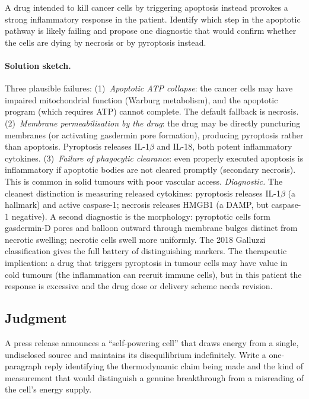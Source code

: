 \begin{exercise}
A drug intended to kill cancer cells by triggering apoptosis instead
provokes a strong inflammatory response in the patient. Identify
which step in the apoptotic pathway is likely failing and propose
one diagnostic that would confirm whether the cells are dying by
necrosis or by pyroptosis instead.
\end{exercise}

\paragraph{Solution sketch.}
Three plausible failures:
(1)~\emph{Apoptotic ATP collapse}: the cancer cells may have impaired
mitochondrial function (Warburg metabolism), and the apoptotic
program (which requires ATP) cannot complete. The default fallback
is necrosis.
(2)~\emph{Membrane permeabilisation by the drug}: the drug may be
directly puncturing membranes (or activating gasdermin pore
formation), producing pyroptosis rather than apoptosis. Pyroptosis
releases IL-1$\beta$ and IL-18, both potent inflammatory cytokines.
(3)~\emph{Failure of phagocytic clearance}: even properly executed
apoptosis is inflammatory if apoptotic bodies are not cleared promptly
(secondary necrosis). This is common in solid tumours with poor
vascular access.
\emph{Diagnostic.} The cleanest distinction is measuring released
cytokines: pyroptosis releases IL-1$\beta$ (a hallmark) and active
caspase-1; necrosis releases HMGB1 (a DAMP, but caspase-1 negative).
A second diagnostic is the morphology: pyroptotic cells form
gasdermin-D pores and balloon outward through membrane bulges
distinct from necrotic swelling; necrotic cells swell more uniformly.
The 2018 Galluzzi classification \cite{paper:v6c01-galluzzi-2018}
gives the full battery of distinguishing markers. The therapeutic
implication: a drug that triggers pyroptosis in tumour cells may have
value in cold tumours (the inflammation can recruit immune cells),
but in this patient the response is excessive and the drug dose or
delivery scheme needs revision.

\subsection*{Judgment}

\begin{exercise}
A press release announces a ``self-powering cell'' that draws energy
from a single, undisclosed source and maintains its disequilibrium
indefinitely. Write a one-paragraph reply identifying the
thermodynamic claim being made and the kind of measurement that
would distinguish a genuine breakthrough from a misreading of the
cell's energy supply.
\end{exercise}

